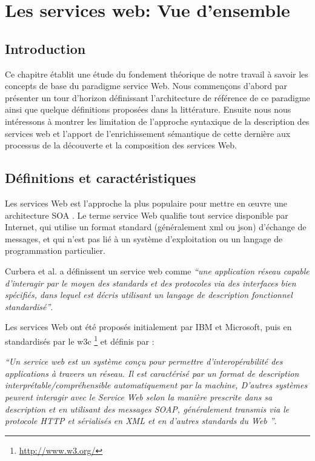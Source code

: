 \chapter{Les services web: Vue d'ensemble}
\section{Introduction}
Ce chapitre établit une étude du fondement théorique de notre travail
à savoir les concepts de base du paradigme service Web.  Nous
commençons d'abord par présenter un tour d'horizon définissant
l'architecture de référence de ce paradigme ainsi que quelque
définitions proposées dans la littérature. Ensuite nous nous
intéressons à montrer les limitation de l'approche syntaxique de la
description des services web et l'apport de l'enrichissement
sémantique de cette dernière aux processus de la découverte et la
composition des services Web.

\newpage
\section{Définitions et caractéristiques}
\label{sec:ws-notions-de-base}

Les services Web est l'approche la plus populaire pour mettre en œuvre
une architecture SOA . Le terme service Web qualifie tout service
disponible par Internet, qui utilise un format standard (généralement
\acrshort{xml} ou \acrshort{json}) d'échange de messages, et qui n'est
pas lié à un système d'exploitation ou un langage de programmation
particulier.

\label{sec:ws-definition}
Curbera et al. \cite{curbera2001web} a définissent un service web
comme \emph{``une application réseau capable d'interagir par le moyen
  des standards et des protocoles via des interfaces bien spécifiés,
  dans lequel est décris utilisant un langage de description
  fonctionnel standardisé''}.

Les services Web ont été proposés initialement par IBM
\cite{kreger2001web} et Microsoft, puis en standardisés par le
\acrshort{w3c} \footnote{\url{http://www.w3.org/}} et définis
\cite{WSA} par :

\emph{``Un service web est un système conçu pour permettre
  d'interopérabilité des applications à travers un réseau.  Il est
  caractérisé par un format de description
  interprétable/compréhensible automatiquement par la machine,
  D'autres systèmes peuvent interagir avec le Service Web selon la
  manière prescrite dans sa description et en utilisant des messages
  SOAP, généralement transmis via le protocole HTTP et sérialisés en
  XML et en d'autres standards du Web ''}.

